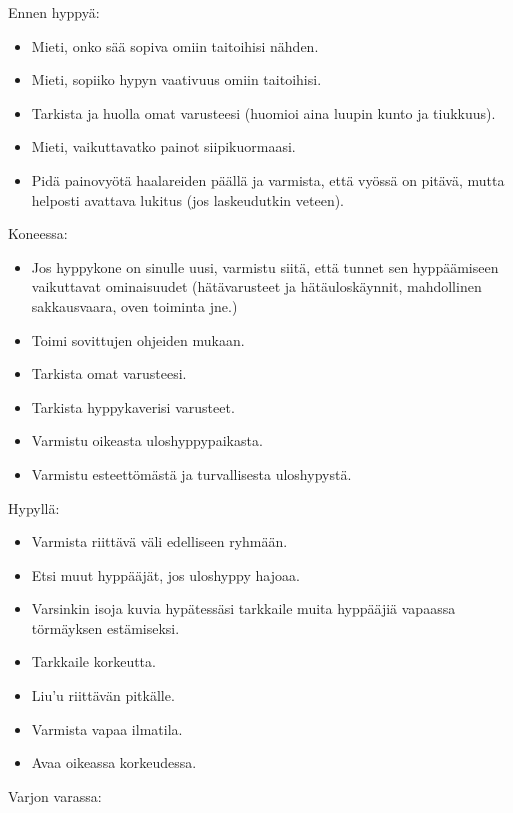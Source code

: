 Ennen hyppyä: 

\begin{itemize}
\item  Mieti, onko sää sopiva omiin taitoihisi nähden.  
\item  Mieti, sopiiko hypyn vaativuus omiin taitoihisi.  
\item  Tarkista ja huolla omat varusteesi (huomioi aina luupin kunto ja tiukkuus).  
\item  Mieti, vaikuttavatko painot siipikuormaasi.  
\item  Pidä painovyötä haalareiden päällä ja varmista, että vyössä on pitävä, mutta helposti avattava lukitus (jos laskeudutkin veteen). 
\end{itemize}

Koneessa: 

\begin{itemize}
\item  Jos hyppykone on sinulle uusi, varmistu siitä, että tunnet sen hyppäämiseen vaikuttavat ominaisuudet (hätävarusteet ja hätäuloskäynnit, mahdollinen sakkausvaara, oven toiminta jne.)  
\item  Toimi sovittujen ohjeiden mukaan.  
\item  Tarkista omat varusteesi.  
\item  Tarkista hyppykaverisi varusteet.  
\item  Varmistu oikeasta uloshyppypaikasta.  
\item  Varmistu esteettömästä ja turvallisesta uloshypystä.  
\end{itemize}

Hypyllä: 

\begin{itemize}
\item  Varmista riittävä väli edelliseen ryhmään.  
\item  Etsi muut hyppääjät, jos uloshyppy hajoaa.  
\item  Varsinkin isoja kuvia hypätessäsi tarkkaile muita hyppääjiä vapaassa törmäyksen estämiseksi.  
\item  Tarkkaile korkeutta.  
\item  Liu'u riittävän pitkälle.  
\item  Varmista vapaa ilmatila.  
\item  Avaa oikeassa korkeudessa.  
\end{itemize}

Varjon varassa: 

